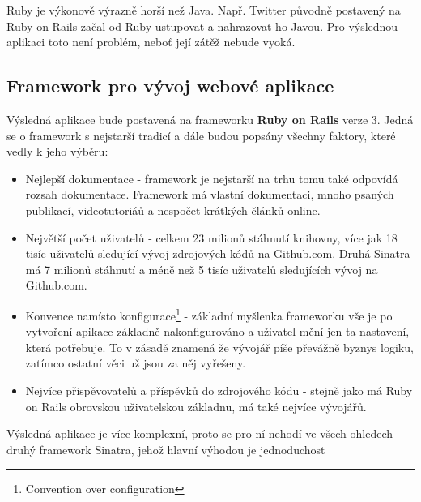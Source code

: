 Ruby je výkonově výrazně horší než Java\cite{website:java-ruby-performance}. Např. Twitter původně postavený na Ruby on Rails začal od Ruby ustupovat a nahrazovat ho Javou\cite{website:twitter-ruby-java}. Pro výslednou aplikaci toto není problém, neboť její zátěž nebude vyoká.

\subsection{Framework pro vývoj webové aplikace}
Výsledná aplikace bude postavená na frameworku \textbf{Ruby on Rails} verze 3. Jedná se o framework s nejstarší tradicí a dále budou popsány všechny faktory, které vedly k jeho výběru:

\begin{itemize}
\item Nejlepší dokumentace - framework je nejstarší na trhu tomu také odpovídá rozsah dokumentace. Framework má vlastní dokumentaci, mnoho psaných publikací, videotutoriáů a nespočet krátkých článků online\cite{website:ruby-toolbox-web}\cite{website:ruby-rails-documentation}.
\item Největší počet uživatelů - celkem 23 milionů stáhnutí knihovny, více jak 18 tisíc uživatelů sledující vývoj zdrojových kódů na Github.com. Druhá Sinatra má 7 milionů stáhnutí a méně než 5 tisíc uživatelů sledujících vývoj na Github.com\cite{website:ruby-toolbox-web}.
\item Konvence namísto konfigurace\footnote{Convention over configuration} - základní myšlenka frameworku vše je po vytvoření apikace základně nakonfigurováno a uživatel mění jen ta nastavení, která potřebuje. To v zásadě znamená že vývojář píše převážně byznys logiku, zatímco ostatní věci už jsou za něj vyřešeny.
\item Nejvíce přispěvovatelů a příspěvků do zdrojového kódu - stejně jako má Ruby on Rails obrovskou uživatelskou základnu, má také nejvíce vývojářů\cite{website:ruby-toolbox-web}.
\end{itemize}

Výsledná aplikace je více komplexní, proto se pro ní nehodí ve všech ohledech druhý framework Sinatra, jehož hlavní výhodou je jednoduchost \cite{harris2011sinatra}

